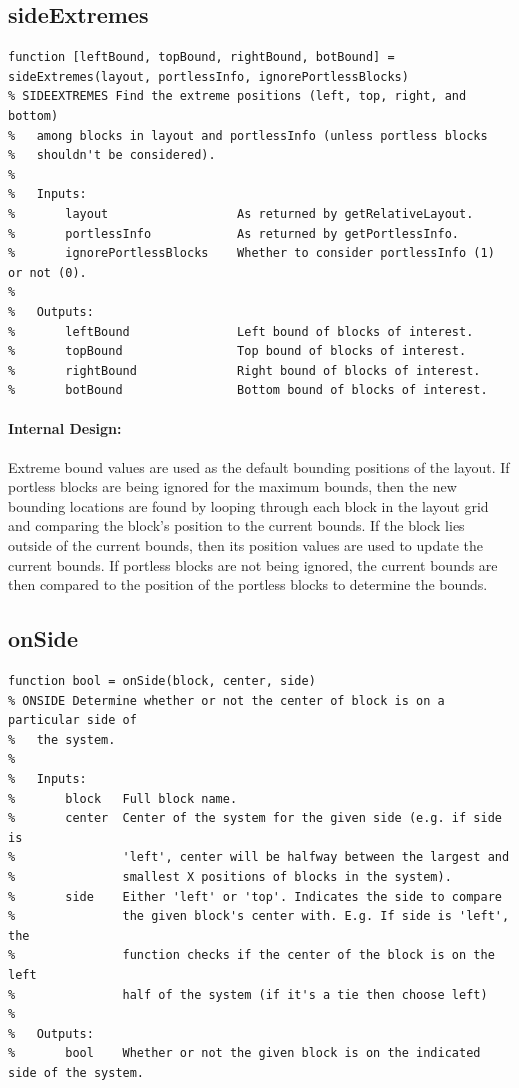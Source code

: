 \documentclass[12pt,letterpaper]{report}
\begin{document}
\subsection{sideExtremes}
\begin{lstlisting}
function [leftBound, topBound, rightBound, botBound] = sideExtremes(layout, portlessInfo, ignorePortlessBlocks)
% SIDEEXTREMES Find the extreme positions (left, top, right, and bottom)
%   among blocks in layout and portlessInfo (unless portless blocks
%   shouldn't be considered).
%
%   Inputs:
%       layout                  As returned by getRelativeLayout.
%       portlessInfo            As returned by getPortlessInfo.
%       ignorePortlessBlocks    Whether to consider portlessInfo (1) or not (0).
%
%   Outputs:
%       leftBound               Left bound of blocks of interest.
%       topBound                Top bound of blocks of interest.
%       rightBound              Right bound of blocks of interest.
%       botBound                Bottom bound of blocks of interest.
\end{lstlisting}
\paragraph{Internal Design:} Extreme bound values are used as the default bounding positions of the layout. If portless blocks are being ignored for the maximum bounds, then the new bounding locations are found by looping through each block in the layout grid and comparing the block's position to the current bounds. If the block lies outside of the current bounds, then its position values are used to update the current bounds. If portless blocks are not being ignored, the current bounds are then compared to the position of the portless blocks to determine the bounds.

\subsection{onSide}
\begin{lstlisting}
function bool = onSide(block, center, side)
% ONSIDE Determine whether or not the center of block is on a particular side of
%   the system.
%
%   Inputs:
%       block   Full block name.
%       center  Center of the system for the given side (e.g. if side is
%               'left', center will be halfway between the largest and
%               smallest X positions of blocks in the system).
%       side    Either 'left' or 'top'. Indicates the side to compare
%               the given block's center with. E.g. If side is 'left', the
%               function checks if the center of the block is on the left
%               half of the system (if it's a tie then choose left)
%
%   Outputs:
%       bool    Whether or not the given block is on the indicated side of the system.
\end{lstlisting}
\end{document}
